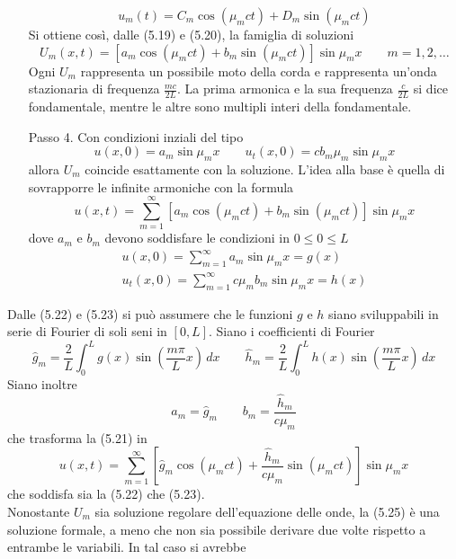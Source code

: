 \documentclass[a4paper,12pt, draft]{article}
\theoremstyle{break}
\numberwithin{equation}{section}
\begin{document}
\begin{itemize}
  \begin{equation}
    u_m(t) = C_m \cos(\mu_m ct) + D_m \sin(\mu_m ct)
  \end{equation}
  Si ottiene così, dalle (5.19) e (5.20), la famiglia di soluzioni 
  \[
    U_m(x,t) = [a_m \cos(\mu_m ct) + b_m \sin(\mu_m ct)] \sin \mu_m x \qquad m= 1, 2, \ldots
  \]
  Ogni \(U_m\) rappresenta un possibile moto della corda e rappresenta un'onda stazionaria di frequenza \(\frac{mc}{2L}\). La prima armonica e la sua frequenza \(\frac{c}{2L}\) si dice fondamentale, mentre le altre sono multipli interi della fondamentale. 
  \item[Passo 4.] Con condizioni inziali del tipo
  \[
    u(x,0) = a_m \sin \mu_m x \qquad u_t(x,0) = cb_m \mu_m \sin \mu_m x
  \] 
  allora \(U_m\) coincide esattamente con la soluzione. L'idea alla base è quella di sovrapporre le infinite armoniche con la formula 
  \begin{equation}
    u(x,t) = \sum_{m=1}^{\infty} [a_m\cos(\mu_m ct) + b_m \sin(\mu_m ct)]\sin \mu_m x
  \end{equation}
  dove \(a_m \mbox{ e } b_m\) devono soddisfare le condizioni in \(0 \leq 0 \leq L\)
  \begin{eqnarray}
    u(x,0) = \sum_{m=1}^{\infty} a_m \sin \mu_m x = g(x) \\
    u_t (x,0) = \sum_{m=1}^{\infty} c\mu_m b_m \sin \mu_m x= h(x)
  \end{eqnarray}
\end{itemize}
Dalle (5.22) e (5.23) si può assumere che le funzioni \(g\) e \(h\) siano sviluppabili in serie di Fourier di soli seni in \([0, L]\). Siano i coefficienti di Fourier
\[
\hat{g}_m = \frac{2}{L} \int_0^L g(x) \sin \left(\frac{m\pi}{L}x\right) \,dx \qquad \hat{h}_m = \frac{2}{L} \int_0^L h(x) \sin \left(\frac{m\pi}{L}x\right) \,dx 
\]
Siano inoltre 
\begin{equation}
  a_m = \hat{g}_m \qquad b_m = \frac{\hat{h}_m}{c\mu_m}
\end{equation}
che trasforma la (5.21) in 
\begin{equation}
  u(x,t) = \sum_{m=1}^{\infty} \left[\hat{g}_m\cos(\mu_m ct) + \frac{\hat{h}_m}{c\mu_m} \sin(\mu_m ct)\right] \sin \mu_m x
\end{equation}
che soddisfa sia la (5.22) che (5.23). \\
Nonostante \(U_m\) sia soluzione regolare dell'equazione delle onde, la (5.25) è una soluzione formale, a meno che non sia possibile derivare due volte rispetto a entrambe le variabili. In tal caso si avrebbe
\end{document}
